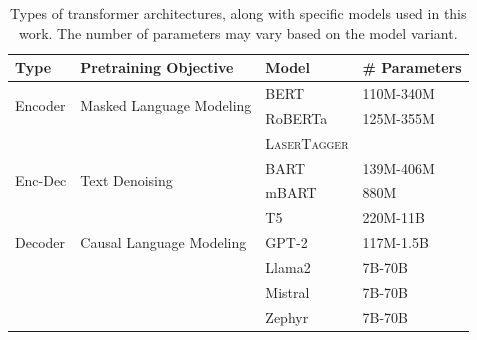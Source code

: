 \begin{table}[ht]
    \footnotesize
    \centering
    \begin{tabular}{lp{4.5cm}ll}
        \toprule
        \textbf{Type}            & \textbf{Pretraining Objective}            & \textbf{Model}                                       & \textbf{\# Parameters} \\
        \midrule
        \multirow{2}{*}{Encoder} & \multirow{2}{*}{Masked Language Modeling} & BERT \cite{devlinBERTPretrainingDeep2019}            & 110M-340M              \\
                                 &                                           & RoBERTa \cite{liuRoBERTaRobustlyOptimized2019}       & 125M-355M              \\
                                 &                                           & \textsc{LaserTagger} \cite{malmi2019lasertagger}     &                        \\
        \midrule
        \multirow{2}{*}{Enc-Dec} & \multirow{2}{*}{Text Denoising}           & BART \cite{lewisBARTDenoisingSequencetoSequence2019} & 139M-406M              \\
                                 &                                           & mBART \cite{liuMultilingualDenoisingPretraining2020} & 880M                   \\
                                 &                                           & T5 \cite{raffelExploringLimitsTransfer2019}          & 220M-11B               \\
        \midrule
        Decoder                  & Causal Language Modeling                  & GPT-2 \cite{radfordLanguageModelsAre2019}            & 117M-1.5B              \\
                                 &                                           & Llama2 \cite{touvronLlamaOpenFoundation2023}         & 7B-70B                 \\
                                 &                                           & Mistral \cite{jiangMistral7B2023}                    & 7B-70B                 \\
                                 &                                           & Zephyr \cite{tunstallZephyrDirectDistillation2023}   & 7B-70B                 \\
        \bottomrule
    \end{tabular}
    \caption{Types of transformer architectures, along with specific models used in this work. The number of parameters may vary based on the model variant.}
    \label{tab:pretrained_models}
\end{table}

